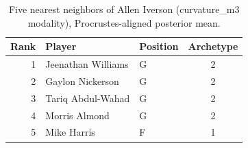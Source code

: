 \begin{table}[htbp]
  \centering\small
  \begin{tabular}{rllc}
    \toprule
    Rank & Player & Position & Archetype \\
    \midrule
    1 & Jeenathan Williams & G & 2 \\
    2 & Gaylon Nickerson & G & 2 \\
    3 & Tariq Abdul-Wahad & G & 2 \\
    4 & Morris Almond & G & 2 \\
    5 & Mike Harris & F & 1 \\
    \bottomrule
  \end{tabular}
  \caption{Five nearest neighbors of Allen Iverson (curvature_m3 modality), Procrustes-aligned posterior mean.}
  \label{tab:Allen_Iverson_neighbors_curvature_m3}
\end{table}

